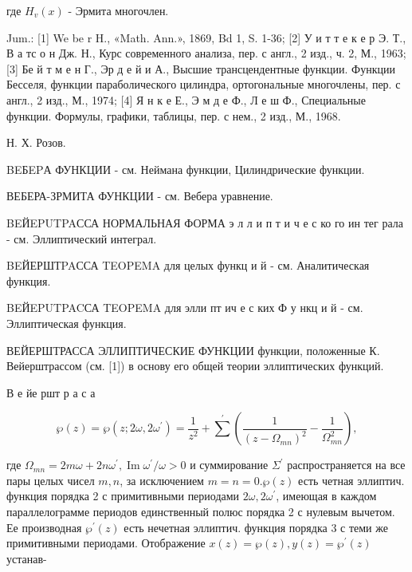 \documentclass[10pt]{article}
\begin{document}
где $H_{v}(x)$ - Эрмита многочлен.



Jum.: [1] We be r H., «Math. Ann.», 1869, Bd 1, S. 1-36; [2] У и т т е к е р Э. Т., В а тс о н Дж. Н., Курс современного анализа, пер. с англ., 2 изд., ч. 2, М., 1963; [3] Бе й т м е н Г., Эр д е й и А., Высшие трансцендентные функции. Функции Бесселя, функции параболического цилиндра, ортогональные многочлены, пер. с англ., 2 изд., М., 1974; [4] Я н к е Е., Э м д е Ф., Л е ш Ф., Специальные функции. Формулы, графики, таблицы, пер. с нем., 2 изд., М., 1968.



Н. Х. Розов.



BEБEPА ФУНКЦИИ - см. Неймана функции, Цилиндрические функции.



ВЕБЕРА-ЗРМИТА ФУНКЦИИ - см. Вебера уравнение.



BEЙEPUTPAССА НОРМАЛЬНАЯ ФОРМА э л л и п т и ч е с ко го ин тег рала - см. Эллиптический интеграл.



BEЙЕРШТPAССА TEOPEMA для целых функц и й - см. Аналитическая функция.



BEЙEPUTPACСА TEOPEMA для элли пт ич е с ких Ф у нкц и й - см. Эллиптическая функция.



ВЕЙЕРШТРАССА ЭЛЛИПТИЧЕСКИЕ ФУНКЦИИ функции, положенные К. Вейерштрассом (см. [1]) в основу его общей теории эллиптических функций.



В е йе ршт р а с а



\[

\wp(z)=\wp\left(z ; 2 \omega, 2 \omega^{\prime}\right)=\frac{1}{z^{2}}+\sum^{\prime}\left(\frac{1}{\left(z-\Omega_{m n}\right)^{2}}-\frac{1}{\Omega_{m n}^{2}}\right),

\]



где $\Omega_{m n}=2 m \omega+2 n \omega^{\prime}, \operatorname{Im} \omega^{\prime} / \omega>0$ и суммирование $\Sigma^{\prime}$ распространяется на все пары целых чисел $m, n$, за исключением $m=n=0 . \wp(z)$ есть четная эллиптич. функция порядка 2 с примитивными периодами $2 \omega, 2 \omega^{\prime}$, имеющая в каждом параллелограмме периодов единственный полюс порядка 2 с нулевым вычетом. Ее производная $\wp^{\prime}(z)$ есть нечетная эллиптич. функция порядка 3 с теми же примитивными периодами. Отображение $x(z)=\wp(z), y(z)=\wp^{\prime}(z)$ устанав-
\end{document}
